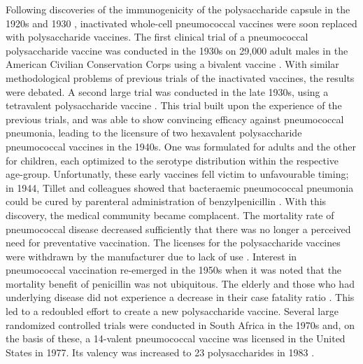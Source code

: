 \documentclass[]{book}
\theoremstyle{definition}
\theoremstyle{definition}
\theoremstyle{definition}
\theoremstyle{remark}
\begin{document}
Following discoveries of the immunogenicity of the polysaccharide
capsule in the 1920s and 1930
\citep{Dochez1917, Finland1931, Francis1930, Heidelberger1923, Schiemann1927},
inactivated whole-cell pneumococcal vaccines were soon replaced with
polysaccharide vaccines. The first clinical trial of a pneumococcal
polysaccharide vaccine was conducted in the 1930s on 29,000 adult males
in the American Civilian Conservation Corps using a bivalent vaccine
\citep{Ekwurzel1938}. With similar methodological problems of previous
trials of the inactivated vaccines, the results were debated. A second
large trial was conducted in the late 1930s, using a tetravalent
polysaccharide vaccine \citep{Macleod1945}. This trial built upon the
experience of the previous trials, and was able to show convincing
efficacy against pneumococcal pneumonia, leading to the licensure of two
hexavalent polysaccharide pneumococcal vaccines in the 1940s. One was
formulated for adults and the other for children, each optimized to the
serotype distribution within the respective age-group. Unfortunatly,
these early vaccines fell victim to unfavourable timing; in 1944, Tillet
and colleagues showed that bacteraemic pneumococcal pneumonia could be
cured by parenteral administration of benzylpenicillin
\citep{Tillett1943}. With this discovery, the medical community became
complacent. The mortality rate of pneumococcal disease decreased
sufficiently that there was no longer a perceived need for preventative
vaccination. The licenses for the polysaccharide vaccines were withdrawn
by the manufacturer due to lack of use \citep{Austrian1999a}. Interest
in pneumococcal vaccination re-emerged in the 1950s when it was noted
that the mortality benefit of penicillin was not ubiquitous. The elderly
and those who had underlying disease did not experience a decrease in
their case fatality ratio \citep{Austrian1964}. This led to a redoubled
effort to create a new polysaccharide vaccine. Several large randomized
controlled trials were conducted in South Africa in the 1970s
\citep[\citet{Smit1977}]{Austrian1976} and, on the basis of these, a
14-valent pneumococcal vaccine was licensed in the United States in
1977. Its valency was increased to 23 polysaccharides in 1983
\citep{Austrian1999a}.
\end{document}
